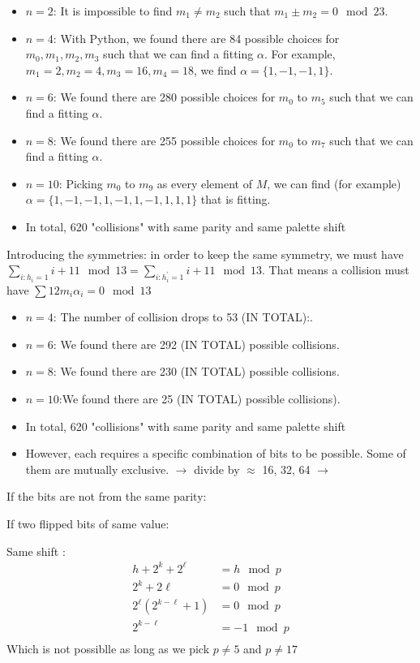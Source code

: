 \documentclass{article}
\begin{document}
\begin{itemize}
	\item $n=2$: It is impossible to find $m_1 \neq m_2$ such that $m_1 \pm m_2 = 0 \mod 23$.
	\item $n=4$: With Python, we found there are 84 possible choices for $m_0, m_1, m_2, m_3$ such that we can find a fitting $\alpha$. For example, $m_1 = 2, m_2 = 4, m_3 = 16, m_4 = 18$, we find $\alpha = \{1, -1, -1,1\}$.
	\item $n=6$: We found there are 280 possible choices for $m_0$ to $m_5$ such that we can find a fitting $\alpha$.
	\item $n=8$: We found there are 255 possible choices for $m_0$ to $m_7$ such that we can find a fitting $\alpha$.
	\item $n=10$: Picking $m_0$ to $m_9$ as every element of $M$, we can find (for example) $\alpha = \{1, -1, -1, 1,-1,1,-1,1,1,1\}$ that is fitting.
	\item In total, 620 "collisions" with same parity and same palette shift
\end{itemize}
Introducing the symmetries: in order to keep the same symmetry, we must have $\sum\limits_{i : h_i =1}i + 11 \mod 13 = \sum\limits_{i : h^\prime_i =1}i + 11 \mod 13$. That means a collision must have $\sum 12m_i\alpha_i = 0\mod 13$
\begin{itemize}
	\item $n=4$: The number of collision drops to 53 (IN TOTAL):.
	\item $n=6$: We found there are 292 (IN TOTAL) possible collisions.
	\item $n=8$: We found there are 230 (IN TOTAL) possible collisions.
	\item $n=10$:We found there are 25 (IN TOTAL) possible collisions).
	\item In total, 620 "collisions" with same parity and same palette shift
	\item However, each requires a specific combination of bits to be possible. Some of them are mutually exclusive. $\rightarrow$ divide by $\approx$ 16, 32, 64 $\rightarrow$  
\end{itemize}

If the bits are not from the same parity:

If two flipped bits of same value:

Same shift : 
\begin{align*}
	h + 2^k + 2^\ell &= h \mod p \\
	2^k + 2\ell &= 0 \mod p\\
	2^\ell( 2^{k-\ell} + 1) &= 0 \mod p\\
 	2^{k-\ell} &= -1 \mod p\\
\end{align*}
Which is not possiblle as long as we pick $p \neq 5$ and $p \neq 17$
\end{document}
